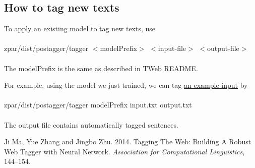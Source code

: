 \documentclass[12pt]{article}
\begin{document}
\begin{CJK}{GBK}{song}
\section{How to tag new texts}
To apply an existing model to tag new texts, use
\\
\\
\hspace{3cm} zpar/dist/postagger/tagger $<$modelPrefix$>$ $<$input-file$>$ $<$output-file$>$
\\
\\
The modelPrefix is the same as described in TWeb README.

For example, using the model we just trained, we can tag \href{eng_pos_files/input.txt}{an example input} by
\\
\\
\hspace{3cm} zpar/dist/postagger/tagger modelPrefix input.txt output.txt
\\
\\
The output file contains automatically tagged sentences.

\begin{thebibliography}{99}
 Ji Ma, Yue Zhang and Jingbo Zhu. 2014. Tagging The Web: Building A Robust Web Tagger with Neural Network. \textit{Association for Computational Linguistics}, 144--154.
\end{thebibliography}
\end{CJK}
\end{document}
